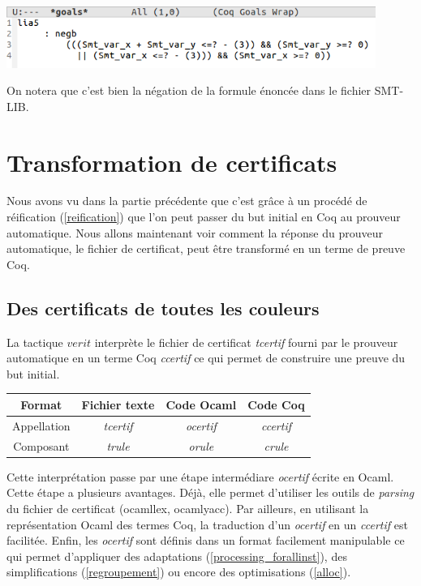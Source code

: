 \documentclass[11pt]{article}
\begin{document}
\includegraphics[height=2cm]{checklia5.png}

On notera que c'est bien la négation de la formule énoncée dans le fichier SMT-LIB. 


\newpage
\section{Transformation de certificats}

Nous avons vu dans la partie précédente que c'est grâce à un procédé de réification (\ref{reification}) que l'on peut passer du but initial en Coq au prouveur automatique. Nous allons maintenant voir comment la réponse du prouveur automatique, le fichier de certificat, peut être transformé en un terme de preuve Coq.

\subsection{Des certificats de toutes les couleurs} \label{des_certificats}

La tactique $verit$ interprète le fichier de certificat \textit{tcertif} fourni par le prouveur automatique en un terme Coq \textit{ccertif} ce qui permet de construire une preuve du but initial. \\

\begin{center}
\begin{tabular}{ |c||c|c|c| } 
 \hline
 Format & Fichier texte & Code Ocaml & Code Coq \\ 
 \hline
 Appellation & \textit{tcertif} & \textit{ocertif} & \textit{ccertif} \\ 
 \hline
 Composant & \textit{trule} & \textit{orule} & \textit{crule} \\ 
 \hline
\end{tabular}
\end{center}

Cette interprétation passe par une étape intermédiare \textit{ocertif} écrite en Ocaml. Cette étape a plusieurs avantages. Déjà, elle permet d'utiliser les outils de \textit{parsing} du fichier de certificat (ocamllex, ocamlyacc). Par ailleurs, en utilisant la représentation Ocaml des termes Coq, la traduction d'un \textit{ocertif} en un \textit{ccertif} est facilitée. Enfin, les \textit{ocertif} sont définis dans un format facilement manipulable ce qui permet d'appliquer des adaptations (\ref{processing_forallinst}), des simplifications (\ref{regroupement}) ou encore des optimisations (\ref{alloc}).
\end{document}

